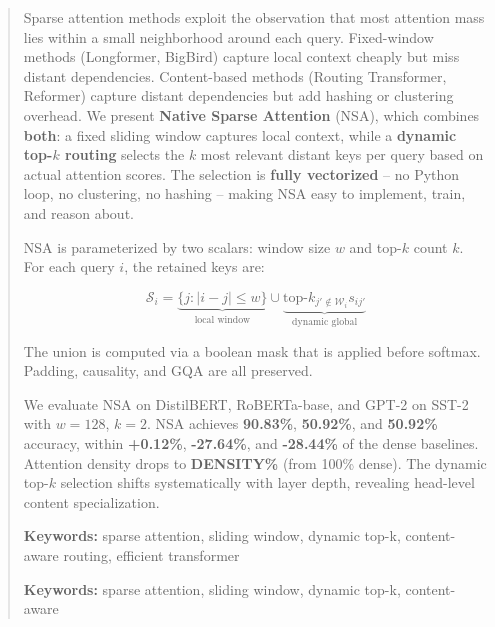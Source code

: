 \documentclass[10pt,twocolumn,letterpaper]{article}
\begin{document}
\maketitle

\begin{abstract}
Sparse attention methods exploit the observation that most attention mass lies 
within a small neighborhood around each query. Fixed-window methods 
(Longformer, BigBird) capture local context cheaply but miss distant 
dependencies. Content-based methods (Routing Transformer, Reformer) capture 
distant dependencies but add hashing or clustering overhead. We present 
\textbf{Native Sparse Attention} (NSA), which combines \textbf{both}: a fixed sliding 
window captures local context, while a \textbf{dynamic top-$k$ routing} selects 
the $k$ most relevant distant keys per query based on actual attention scores. 
The selection is \textbf{fully vectorized} -- no Python loop, no clustering, no 
hashing -- making NSA easy to implement, train, and reason about.

NSA is parameterized by two scalars: window size $w$ and top-$k$ count $k$. 
For each query $i$, the retained keys are:

\[
\mathcal{S}_i = \underbrace{\{j : |i - j| \leq w\}}_{\text{local window}} \cup \underbrace{\text{top-}k_{j' \notin \mathcal{W}_i} s_{ij'}}_{\text{dynamic global}}
\]

The union is computed via a boolean mask that is applied before softmax. 
Padding, causality, and GQA are all preserved.

We evaluate NSA on DistilBERT, RoBERTa-base, and GPT-2 on SST-2 with 
$w = 128$, $k = 2$. NSA achieves \textbf{90.83\%}, 
\textbf{50.92\%}, and \textbf{50.92\%} accuracy, within \textbf{+0.12\%}, 
\textbf{-27.64\%}, and \textbf{-28.44\%} of the dense baselines. Attention 
density drops to \textbf{DENSITY\%} (from 100\% dense). The dynamic top-$k$ 
selection shifts systematically with layer depth, revealing head-level 
content specialization.

\textbf{Keywords:} sparse attention, sliding window, dynamic top-k, content-aware 
routing, efficient transformer



\vspace{0.5em}
\noindent\textbf{Keywords:} sparse attention, sliding window, dynamic top-k, content-aware
\end{abstract}

\vspace{1em}
\end{document}
